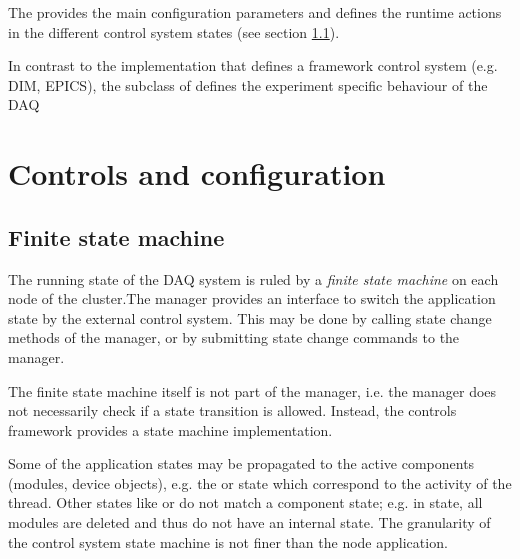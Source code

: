 \item  The   provides the main configuration parameters
and defines the runtime actions in the different control system states (see section \ref{prog_fsm}).

\item In contrast to the  implementation that defines a framework control system (e.g. DIM, EPICS),
the subclass of  defines the experiment specific behaviour of the DAQ

\ecir

               
\section{Controls and configuration}
\subsection{Finite state machine}
\label{prog_fsm}
The running state of the DAQ system is ruled by a {\sl finite state machine} on 
each node of the cluster.The manager provides an interface to switch the application 
	 state by the external control system. This may be done by calling 
	 state change methods of the manager, or by submitting state change commands 
      to the manager.

The finite state machine itself is not part of the manager, 
      i.e. the manager does not necessarily check if a state transition 
      is allowed. Instead, the controls framework provides a 
      state machine implementation.

Some of the application states may be propagated to the 
      active components (modules, device objects), e.g. the 
       or  state which correspond to the activity of the thread. 
      Other states like  or  do not match a component state; 
      e.g. in  state, all modules are deleted and thus do not 
      have an internal state. The granularity of the control system state 
      machine is not finer than the node application.

